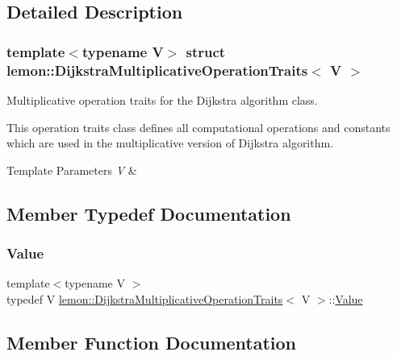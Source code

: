 \subsection{Detailed Description}
\subsubsection*{template$<$typename V$>$\newline
struct lemon\+::\+Dijkstra\+Multiplicative\+Operation\+Traits$<$ V $>$}

Multiplicative operation traits for the Dijkstra algorithm class. 

This operation traits class defines all computational operations and constants which are used in the multiplicative version of Dijkstra algorithm.


\begin{DoxyTemplParams}{Template Parameters}
{\em V} & \\
\hline
\end{DoxyTemplParams}


\subsection{Member Typedef Documentation}
\mbox{\label{structlemon_1_1_dijkstra_multiplicative_operation_traits_a8832632b11125d59eedb238160bc1554}} 
\subsubsection{\texorpdfstring{Value}{Value}}
{\footnotesize\ttfamily template$<$typename V $>$ \\
typedef V \hyperlink{structlemon_1_1_dijkstra_multiplicative_operation_traits}{lemon\+::\+Dijkstra\+Multiplicative\+Operation\+Traits}$<$ V $>$\+::\hyperlink{structlemon_1_1_dijkstra_multiplicative_operation_traits_a8832632b11125d59eedb238160bc1554}{Value}}



\subsection{Member Function Documentation}
\mbox{\label{structlemon_1_1_dijkstra_multiplicative_operation_traits_a0e6d5f836763e814cb562d7f5e5be67f}} 
